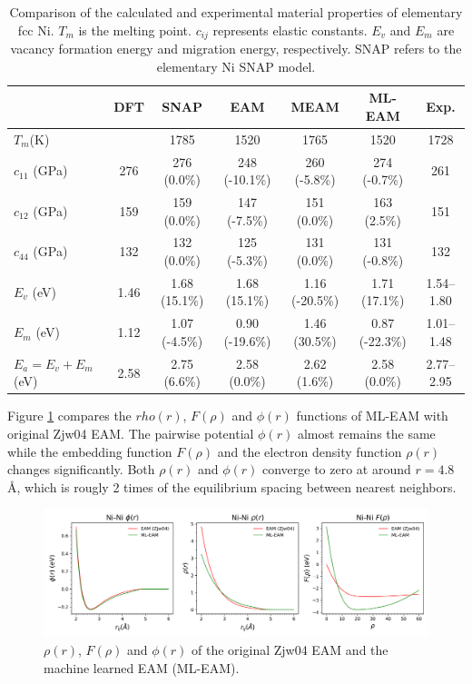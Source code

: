 \documentclass[prb,reprint]{revtex4-2}
\begin{document}
% 
%
\begin{table}[htp]
\centering
\begin{tabular}{lcccccc}
\hline
    & DFT & SNAP & EAM & MEAM & ML-EAM & Exp. \\
\hline
$T_{m}$(K) & & 1785 & 1520 & 1765 & 1520 & 1728 \\
$c_{11}$ (GPa) & 276 & 276 (0.0\%) & 248 (-10.1\%) & 260 (-5.8\%) & 274 (-0.7\%) & 261 \\
$c_{12}$ (GPa) & 159 & 159 (0.0\%) & 147 (-7.5\%) & 151 (0.0\%) & 163 (2.5\%) & 151 \\
$c_{44}$ (GPa) & 132 & 132 (0.0\%) & 125 (-5.3\%) & 131 (0.0\%) & 131 (-0.8\%) & 132 \\
$E_{v}$ (eV) & 1.46 & 1.68 (15.1\%) & 1.68 (15.1\%) & 1.16 (-20.5\%) & 1.71 (17.1\%) & 1.54–1.80 \\
$E_{m}$ (eV) & 1.12 & 1.07 (-4.5\%) & 0.90 (-19.6\%) & 1.46 (30.5\%) & 0.87 (-22.3\%) & 1.01–1.48 \\
$E_{a} = E_{v} + E_{m} $ (eV) & 2.58 & 2.75 (6.6\%) & 2.58 (0.0\%) & 2.62 (1.6\%) & 2.58 (0.0\%) & 2.77–2.95 \\
\hline
\end{tabular}
\caption{\label{table:elementary_Ni} Comparison of the calculated and 
experimental material properties of elementary fcc Ni. $T_{m}$ is the melting 
point. $c_{ij}$ represents elastic constants. $E_{v}$ and $E_{m}$ are vacancy 
formation energy and migration energy, respectively. SNAP refers to the 
elementary Ni SNAP model.
}
\end{table}

Figure \ref{fig:Ni_eam} compares the $rho(r)$, $F(\rho)$ and $\phi(r)$ functions
of ML-EAM with original Zjw04 EAM. The pairwise potential $\phi(r)$ almost 
remains the same while the embedding function $F(\rho)$ and the electron density 
function $\rho(r)$ changes significantly. Both $\rho(r)$ and $\phi(r)$ converge
to zero at around $r=4.8$ \AA, which is rougly 2 times of the equilibrium 
spacing between nearest neighbors.

% 
%
\begin{figure}[htp]
\centering
\includegraphics[scale=0.57]{figures/Ni_eam.png}
\caption{\label{fig:Ni_eam} $\rho(r)$, $F(\rho)$ and $\phi(r)$ of the original 
Zjw04 EAM and the machine learned EAM (ML-EAM).}
\end{figure}
\end{document}
